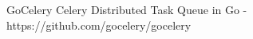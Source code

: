 

\begin{cvhonors}

  \cvhonor
    {GoCelery} %
    {Celery Distributed Task Queue in Go - https://github.com/gocelery/gocelery} %
    {} %
    {\faStar{}} %

\end{cvhonors}
